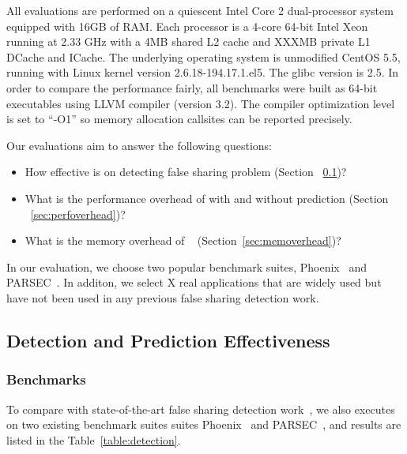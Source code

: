 All evaluations are performed on a quiescent Intel Core 2 dual-processor system equipped with 
16GB of RAM. 
Each processor is a 4-core 64-bit Intel Xeon running at 2.33 GHz with a 4MB
shared L2 cache and XXXMB private L1 DCache and ICache. 
The underlying operating system is unmodified CentOS 5.5, running with Linux kernel
version 2.6.18-194.17.1.el5. The glibc version is 2.5. 
In order to compare the performance fairly, all benchmarks were built as 64-bit executables 
using LLVM compiler (version 3.2). The compiler optimization level is set to ``-O1'' 
so memory allocation callsites can be reported precisely.

Our evaluations aim to answer the following questions:
\begin{itemize}
\item
  How effective is  on detecting false sharing problem (Section ~\ref{sec:effective})?

\item
  What is the performance overhead of  with and without prediction
  (Section ~\ref{sec:perfoverhead})?

\item
  What is the memory overhead of ~ (Section~\ref{sec:memoverhead})?
\end{itemize}

In our evaluation, we choose 
two popular benchmark suites, Phoenix~\cite{phoenix-hpca} and PARSEC~\cite{parsec}.
In additon, we select X real applications that are widely used but have not
been used in any previous false sharing detection work.

\subsection{Detection and Prediction Effectiveness}
\label{sec:effective}

\subsubsection{Benchmarks}
To compare with state-of-the-art false sharing detection work~\cite{sheriff, OSdetection}, 
we also executes  on two existing benchmark suites 
suites Phoenix~\cite{phoenix-hpca} and PARSEC~\cite{parsec}, 
and results are listed in the Table~\ref{table:detection}. 

